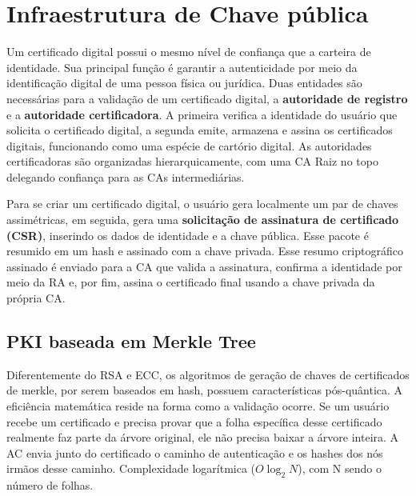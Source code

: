 \chapter{Infraestrutura de Chave pública}
Um certificado digital possui o mesmo nível de confiança que a carteira de identidade. Sua principal função é garantir a autenticidade por meio da identificação digital de uma pessoa física ou jurídica. Duas entidades são necessárias para a validação de um certificado digital, a \textbf{autoridade de registro} e a \textbf{autoridade certificadora}. A primeira verifica a identidade do usuário que solicita o certificado digital, a segunda emite, armazena e assina os certificados digitais, funcionando como uma espécie de cartório digital. As autoridades certificadoras são organizadas hierarquicamente, com uma CA Raiz no topo delegando confiança para as CAs intermediárias.

Para se criar um certificado digital, o usuário gera localmente um par de chaves assimétricas, em seguida, gera uma \textbf{solicitação de assinatura de certificado (CSR)}, inserindo os dados de identidade e a chave pública. Esse pacote é resumido em um hash e assinado com a chave privada. Esse resumo criptográfico assinado é enviado para a CA que valida a assinatura, confirma a identidade por meio da RA e, por fim, assina o certificado final usando a chave privada da própria CA.

\section{PKI baseada em Merkle Tree}
Diferentemente do RSA e ECC, os algoritmos de geração de chaves de certificados de merkle, por serem baseados em hash, possuem características pós-quântica. A eficiência matemática reside na forma como a validação ocorre. Se um usuário recebe um certificado e precisa provar que a folha específica desse certificado realmente faz parte da árvore original, ele não precisa baixar a árvore inteira. A AC envia junto do certificado o caminho de autenticação e os hashes dos nós irmãos desse caminho. Complexidade logarítmica ($O\log_2{N}$), com N sendo o número de folhas.

